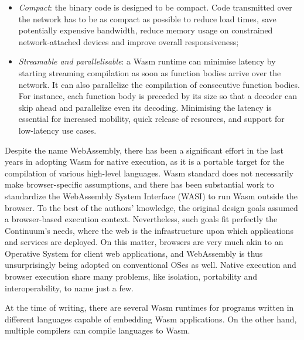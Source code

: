 \begin{itemize}
    \item \emph{Compact}: the binary code is designed to be compact. Code transmitted over the network has to be as compact as possible to reduce load times, save potentially expensive bandwidth, reduce memory usage on constrained network-attached devices and improve overall responsiveness;
    \item \emph{Streamable and parallelisable}: a Wasm runtime can minimise latency by starting streaming compilation as soon as function bodies arrive over the network. It can also parallelize the compilation of consecutive function bodies. For instance, each function body is preceded by its size so that a decoder can skip ahead and parallelize even its decoding. Minimising the latency is essential for increased mobility, quick release of resources, and support for low-latency use cases.
\end{itemize}

Despite the name WebAssembly, there has been a significant effort in the last years in adopting Wasm for native execution, as it is a portable target for the compilation of various high-level languages. Wasm standard does not necessarily make browser-specific assumptions, and there has been substantial work to standardize the WebAssembly System Interface (WASI) to run Wasm outside the browser. To the best of the authors' knowledge, the original design goals assumed a browser-based execution context. Nevertheless, such goals fit perfectly the Continuum's needs, where the web is the infrastructure upon which applications and services are deployed. On this matter, browsers are very much akin to an Operative System for client web applications, and WebAssembly is thus unsurprisingly being adopted on conventional OSes as well. Native execution and browser execution share many problems, like isolation, portability and interoperability, to name just a few.

At the time of writing, there are several Wasm runtimes for programs written in different languages capable of embedding Wasm applications. On the other hand, multiple compilers can compile languages to Wasm.

